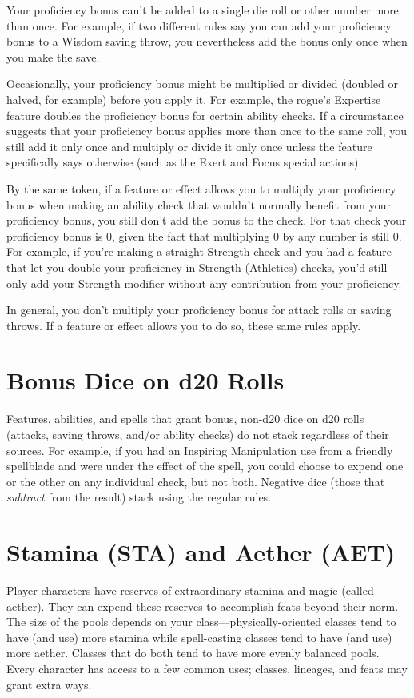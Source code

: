 Your proficiency bonus can't be added to a single die roll or other number more than once. For example, if two different rules say you can add your proficiency bonus to a Wisdom saving throw, you nevertheless add the bonus only once when you make the save.

Occasionally, your proficiency bonus might be multiplied or divided (doubled or halved, for example) before you apply it. For example, the rogue's Expertise feature doubles the proficiency bonus for certain ability checks. If a circumstance suggests that your proficiency bonus applies more than once to the same roll, you still add it only once and multiply or divide it only once unless the feature specifically says otherwise (such as the Exert and Focus special actions).

By the same token, if a feature or effect allows you to multiply your proficiency bonus when making an ability check that wouldn't normally benefit from your proficiency bonus, you still don't add the bonus to the check. For that check your proficiency bonus is 0, given the fact that multiplying 0 by any number is still 0. For example, if you're making a straight Strength check and you had a feature that let you double your proficiency in Strength (Athletics) checks, you'd still only add your Strength modifier without any contribution from your proficiency.

In general, you don't multiply your proficiency bonus for attack rolls or saving throws. If a feature or effect allows you to do so, these same rules apply.

\section{Bonus Dice on d20 Rolls}
Features, abilities, and spells that grant bonus, non-d20 dice on d20 rolls (attacks, saving throws, and/or ability checks) do not stack regardless of their sources. For example, if you had an Inspiring Manipulation use from a friendly spellblade and were under the effect of the  spell, you could choose to expend one or the other on any individual check, but not both. Negative dice (those that \textit{subtract} from the result) stack using the regular rules. 

\section{Stamina (STA) and Aether (AET)}\label{sec:stamina-and-aether}
Player characters have reserves of extraordinary stamina and magic (called aether). They can expend these reserves to accomplish feats beyond their norm. The size of the pools depends on your class---physically-oriented classes tend to have (and use) more stamina while spell-casting classes tend to have (and use) more aether. Classes that do both tend to have more evenly balanced pools. Every character has access to a few common uses; classes, lineages, and feats may grant extra ways.

